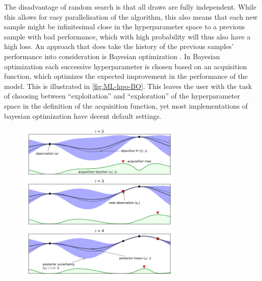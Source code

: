 The disadvantage of random search is that all draws are fully independent. While this allows for easy parallelisation of the algorithm, this also means that each new sample might be infinitesimal close in the hyperparameter space to a previous sample with bad performance, which with high probability will thus also have a high loss. An approach that does take the history of the previous samples' performance into consideration is Bayesian optimization \autocite{brochuTutorialBayesianOptimization2010a}. In Bayesian optimization each successive hyperparameter is chosen based on an acquisition function, which optimizes the expected improvement in the performance of the model. This is illustrated in \autoref{fig:ML-hpo-BO}. This leaves the user with the task of choosing between ``exploitation'' and ``exploration'' of the hyperparameter space in the definition of the acquisition function, yet most implementations of bayesian optimization have decent default settings.

\begin{figure}[htbp]
    \centering
    \includegraphics[width=0.7\textwidth]{figures/MasterThesis-hpo-bayesian}
\end{figure}

